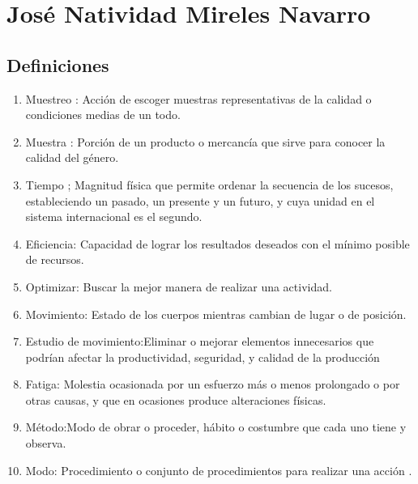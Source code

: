 \section{José Natividad Mireles Navarro}
\subsection{Definiciones}



\begin{enumerate}
    \item Muestreo : Acción de escoger muestras representativas de la calidad o condiciones medias de un todo.
    \item Muestra : Porción de un producto o mercancía que sirve para conocer la calidad del género.
    \item Tiempo ;  Magnitud física que permite ordenar la secuencia de los sucesos, estableciendo un pasado, un presente y un futuro, y cuya unidad en el sistema internacional es el segundo.
    \item Eficiencia: Capacidad de lograr los resultados deseados con el mínimo posible de recursos.
    \item Optimizar: Buscar la mejor manera de realizar una actividad.
    \item Movimiento: Estado de los cuerpos mientras cambian de lugar o de posición.
    \item Estudio de movimiento:Eliminar o mejorar elementos innecesarios que podrían afectar la productividad, seguridad, y calidad de la producción
    \item Fatiga: Molestia ocasionada por un esfuerzo más o menos prolongado o por otras causas, y que en ocasiones produce alteraciones físicas.
    \item Método:Modo de obrar o proceder, hábito o costumbre que cada uno tiene y observa.
    \item Modo: Procedimiento o conjunto de procedimientos para realizar una acción \cite{RAE}.
\end{enumerate}